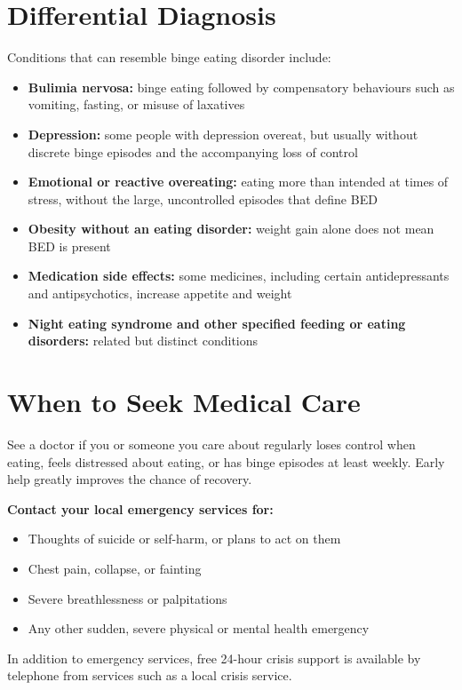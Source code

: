 \section*{Differential Diagnosis}
Conditions that can resemble binge eating disorder include:

\begin{itemize}
    \item \textbf{Bulimia nervosa:} binge eating followed by compensatory behaviours such as vomiting, fasting, or misuse of laxatives
    \item \textbf{Depression:} some people with depression overeat, but usually without discrete binge episodes and the accompanying loss of control
    \item \textbf{Emotional or reactive overeating:} eating more than intended at times of stress, without the large, uncontrolled episodes that define BED
    \item \textbf{Obesity without an eating disorder:} weight gain alone does not mean BED is present
    \item \textbf{Medication side effects:} some medicines, including certain antidepressants and antipsychotics, increase appetite and weight
    \item \textbf{Night eating syndrome and other specified feeding or eating disorders:} related but distinct conditions
\end{itemize}

\section*{When to Seek Medical Care}
See a doctor if you or someone you care about regularly loses control when eating, feels distressed about eating, or has binge episodes at least weekly. Early help greatly improves the chance of recovery.

\textbf{Contact your local emergency services for:}
\begin{itemize}
    \item Thoughts of suicide or self-harm, or plans to act on them
    \item Chest pain, collapse, or fainting
    \item Severe breathlessness or palpitations
    \item Any other sudden, severe physical or mental health emergency
\end{itemize}

In addition to emergency services, free 24-hour crisis support is available by telephone from services such as a local crisis service.

